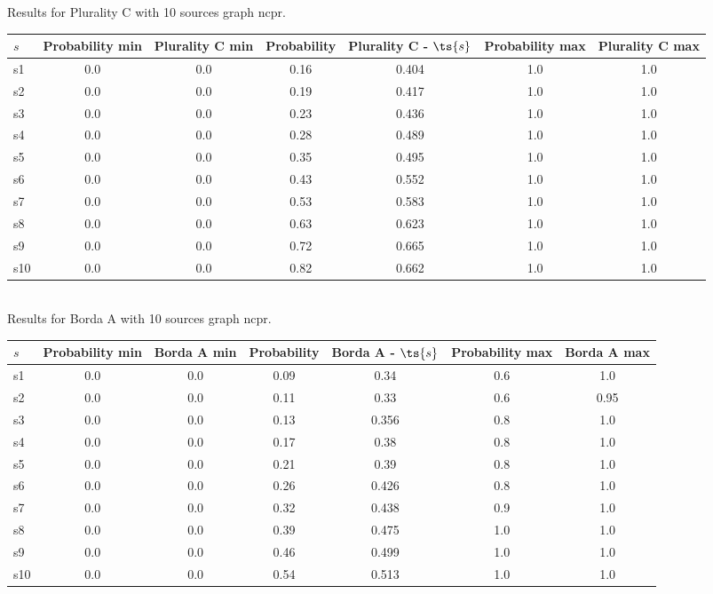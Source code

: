 \documentclass{article}
\begin{document}
\noindent Results for Plurality C with 10 sources graph ncpr.

\noindent\begin{tabular}{|l|c|c|c|c|c|c|}
\hline
$s$& Probability min & Plurality C min & Probability & Plurality C - $\ts{s}$ & Probability max & Plurality C max\\
\hline
s1 &0.0 & 0.0 & 0.16 & 0.404 & 1.0 & 1.0\\
\hline
s2 &0.0 & 0.0 & 0.19 & 0.417 & 1.0 & 1.0\\
\hline
s3 &0.0 & 0.0 & 0.23 & 0.436 & 1.0 & 1.0\\
\hline
s4 &0.0 & 0.0 & 0.28 & 0.489 & 1.0 & 1.0\\
\hline
s5 &0.0 & 0.0 & 0.35 & 0.495 & 1.0 & 1.0\\
\hline
s6 &0.0 & 0.0 & 0.43 & 0.552 & 1.0 & 1.0\\
\hline
s7 &0.0 & 0.0 & 0.53 & 0.583 & 1.0 & 1.0\\
\hline
s8 &0.0 & 0.0 & 0.63 & 0.623 & 1.0 & 1.0\\
\hline
s9 &0.0 & 0.0 & 0.72 & 0.665 & 1.0 & 1.0\\
\hline
s10 &0.0 & 0.0 & 0.82 & 0.662 & 1.0 & 1.0\\
\hline
\end{tabular}\\

\noindent Results for Borda A with 10 sources graph ncpr.

\noindent\begin{tabular}{|l|c|c|c|c|c|c|}
\hline
$s$& Probability min & Borda A min & Probability & Borda A - $\ts{s}$ & Probability max & Borda A max\\
\hline
s1 &0.0 & 0.0 & 0.09 & 0.34 & 0.6 & 1.0\\
\hline
s2 &0.0 & 0.0 & 0.11 & 0.33 & 0.6 & 0.95\\
\hline
s3 &0.0 & 0.0 & 0.13 & 0.356 & 0.8 & 1.0\\
\hline
s4 &0.0 & 0.0 & 0.17 & 0.38 & 0.8 & 1.0\\
\hline
s5 &0.0 & 0.0 & 0.21 & 0.39 & 0.8 & 1.0\\
\hline
s6 &0.0 & 0.0 & 0.26 & 0.426 & 0.8 & 1.0\\
\hline
s7 &0.0 & 0.0 & 0.32 & 0.438 & 0.9 & 1.0\\
\hline
s8 &0.0 & 0.0 & 0.39 & 0.475 & 1.0 & 1.0\\
\hline
s9 &0.0 & 0.0 & 0.46 & 0.499 & 1.0 & 1.0\\
\hline
s10 &0.0 & 0.0 & 0.54 & 0.513 & 1.0 & 1.0\\
\hline
\end{tabular}\\
\end{document}
